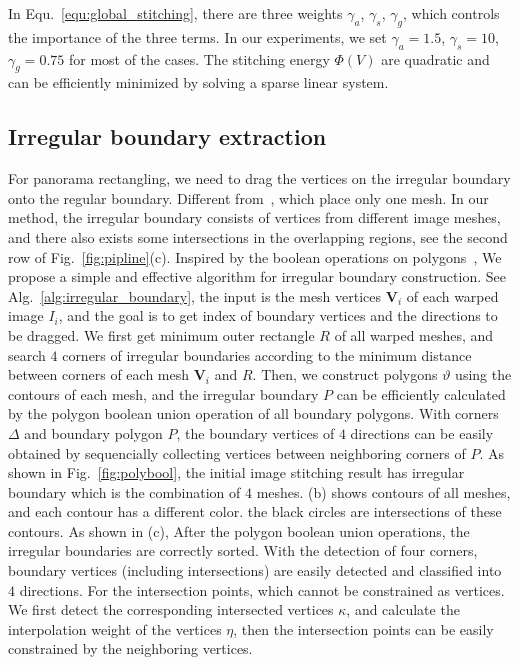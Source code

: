 \documentclass[10pt,journal,compsoc]{IEEEtran}
\begin{document}
In Equ.~\ref{equ:global_stitching}, there are three weights $\gamma_a$, $\gamma_s$, $\gamma_g$, which controls the importance of the three terms. In our experiments, we set $\gamma_a=1.5$, $\gamma_s=10$, $\gamma_g=0.75$ for most of the cases. The stitching energy $\Phi(V)$ are quadratic and can be efficiently minimized by solving a sparse linear system.

\subsection{Irregular boundary extraction}
 \label{sec:irregular_boundary}
For panorama rectangling, we need to drag the vertices on the irregular boundary onto the regular boundary.
Different from~\cite{journals/tog/HeC013}, which place only one mesh. In our method, the irregular boundary consists of vertices from different image meshes, and there also exists some intersections in the overlapping regions, see the second row of Fig.~\ref{fig:pipline}(c).
Inspired by the boolean operations on polygons~\cite{journals/gandc/MartinezRF09}, We propose a simple and effective algorithm for irregular boundary construction.
See Alg.~\ref{alg:irregular_boundary}, the input is the mesh vertices $\mathbf{V}_i$ of each warped image $I_i$, and the goal is to get index of boundary vertices and the directions to be dragged.
We first get minimum outer rectangle $R$ of all warped meshes, and search $4$ corners of irregular boundaries according to the minimum distance between corners of each mesh $\mathbf{V}_i$ and $R$.
Then, we construct polygons $\vartheta$  using the contours of each mesh, and the irregular boundary $P$ can be efficiently calculated by the polygon boolean union operation of all boundary polygons.
With corners $\Delta$ and boundary polygon $P$, the boundary vertices of $4$ directions can be easily obtained by sequencially collecting vertices between neighboring corners of $P$.
As shown in Fig.~\ref{fig:polybool}, the initial image stitching result has irregular boundary which is the combination of $4$ meshes.
(b) shows contours of all meshes, and each contour has a different color.  the black circles are intersections of these contours.
As shown in (c), After the polygon boolean union operations, the irregular boundaries are correctly sorted. With the detection of four corners, boundary vertices (including intersections) are easily detected and classified into $4$ directions.
For the intersection points, which cannot be constrained as vertices. We first detect the corresponding intersected vertices $\kappa$, and calculate the interpolation weight of the vertices $\eta$,
then the intersection points can be easily constrained by the neighboring vertices.
\end{document}
